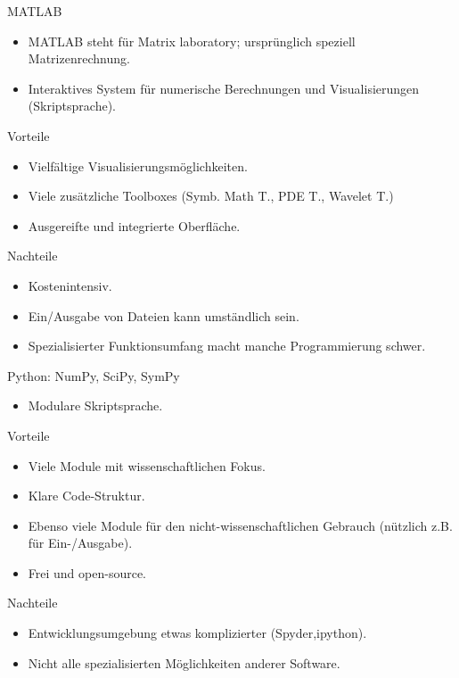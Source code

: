 \documentclass[hyperref={xetex}]{beamer}
\begin{document}
\begin{frame}[fragile]{MATLAB}

\begin{itemize}
\item MATLAB steht für \alert{Mat}rix \alert{lab}oratory; ursprünglich speziell Matrizenrechnung.
\item Interaktives System für numerische Berechnungen und Visualisierungen (Skriptsprache).
\end{itemize}
\begin{block}{Vorteile}
\begin{itemize}
\item Vielfältige Visualisierungsmöglichkeiten.
\item Viele zusätzliche Toolboxes (Symb. Math T., PDE T., Wavelet T.)  
\item Ausgereifte und integrierte Oberfläche.
\end{itemize}
\end{block}
\begin{block}{Nachteile}
    \begin{itemize}
        \item Kostenintensiv.
        \item Ein/Ausgabe von Dateien kann umständlich sein.
        \item Spezialisierter Funktionsumfang macht manche Programmierung schwer.
    \end{itemize}
  
\end{block}
\end{frame}

\begin{frame}[fragile]{Python: NumPy, SciPy, SymPy}

\begin{itemize}
  \item Modulare Skriptsprache.
\end{itemize}

\begin{block}{Vorteile}
\begin{itemize}
  \item Viele Module mit wissenschaftlichen Fokus.
  \item Klare Code-Struktur.
  \item Ebenso viele Module für den nicht-wissenschaftlichen Gebrauch (nützlich z.B. für Ein-/Ausgabe).
  \item Frei und open-source.
\end{itemize}
  
\end{block}
\begin{block}{Nachteile}
\begin{itemize}
  \item Entwicklungsumgebung etwas komplizierter (Spyder,ipython).
  \item Nicht alle spezialisierten Möglichkeiten anderer Software.
\end{itemize}
  
\end{block}
\end{frame}
\end{document}
